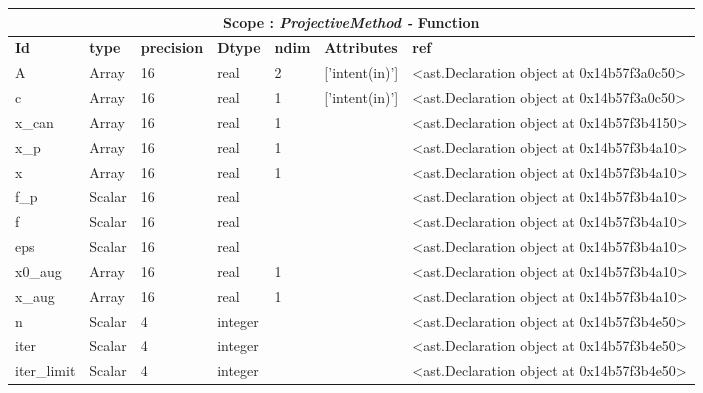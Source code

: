 \documentclass{report}
\begin{document}
\begin{center}
\begin{longtable}{|p{3.5cm}|p{1.5cm}|p{1.5cm}|p{1.5cm}|p{1cm}|p{2cm}|p{4cm}| }
\hline
\multicolumn{7}{|c|}{\textbf{Scope : \qquad}  \textbf{\textit{ProjectiveMethod - }Function}}\\ 
\hline
\textbf{Id} & \textbf{type} & \textbf{precision} & \textbf{Dtype} & \textbf{ndim} & \textbf{Attributes} & \textbf{ref} \\\hline

A & Array & 16 & real & 2 & ['intent(in)'] & <ast.Declaration object at 0x14b57f3a0c50> \\\hline

c & Array & 16 & real & 1 & ['intent(in)'] & <ast.Declaration object at 0x14b57f3a0c50> \\\hline

x\_can & Array & 16 & real & 1 &  & <ast.Declaration object at 0x14b57f3b4150> \\\hline

x\_p & Array & 16 & real & 1 &  & <ast.Declaration object at 0x14b57f3b4a10> \\\hline

x & Array & 16 & real & 1 &  & <ast.Declaration object at 0x14b57f3b4a10> \\\hline

f\_p & Scalar & 16 & real &  &  & <ast.Declaration object at 0x14b57f3b4a10> \\\hline

f & Scalar & 16 & real &  &  & <ast.Declaration object at 0x14b57f3b4a10> \\\hline

eps & Scalar & 16 & real &  &  & <ast.Declaration object at 0x14b57f3b4a10> \\\hline

x0\_aug & Array & 16 & real & 1 &  & <ast.Declaration object at 0x14b57f3b4a10> \\\hline

x\_aug & Array & 16 & real & 1 &  & <ast.Declaration object at 0x14b57f3b4a10> \\\hline

n & Scalar & 4 & integer &  &  & <ast.Declaration object at 0x14b57f3b4e50> \\\hline

iter & Scalar & 4 & integer &  &  & <ast.Declaration object at 0x14b57f3b4e50> \\\hline

iter\_limit & Scalar & 4 & integer &  &  & <ast.Declaration object at 0x14b57f3b4e50> \\\hline


\end{longtable}
\end{center}
\end{document}

